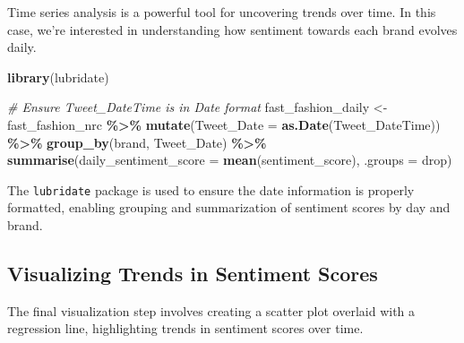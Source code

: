 \documentclass[
]{book}
\newenvironment{Shaded}{\begin{snugshade}}{\end{snugshade}}
\newcommand{\AttributeTok}[1]{\textcolor[rgb]{0.13,0.29,0.53}{#1}}
\newcommand{\CommentTok}[1]{\textcolor[rgb]{0.56,0.35,0.01}{\textit{#1}}}
\newcommand{\FunctionTok}[1]{\textcolor[rgb]{0.13,0.29,0.53}{\textbf{#1}}}
\newcommand{\NormalTok}[1]{#1}
\newcommand{\OtherTok}[1]{\textcolor[rgb]{0.56,0.35,0.01}{#1}}
\newcommand{\SpecialCharTok}[1]{\textcolor[rgb]{0.81,0.36,0.00}{\textbf{#1}}}
\newcommand{\StringTok}[1]{\textcolor[rgb]{0.31,0.60,0.02}{#1}}
\begin{document}
Time series analysis is a powerful tool for uncovering trends over time. In this case, we're interested in understanding how sentiment towards each brand evolves daily.

\begin{Shaded}
\begin{Highlighting}[]
\FunctionTok{library}\NormalTok{(lubridate)}

\CommentTok{\# Ensure Tweet\_DateTime is in Date format}
\NormalTok{fast\_fashion\_daily }\OtherTok{\textless{}{-}}\NormalTok{ fast\_fashion\_nrc }\SpecialCharTok{\%\textgreater{}\%}
  \FunctionTok{mutate}\NormalTok{(}\AttributeTok{Tweet\_Date =} \FunctionTok{as.Date}\NormalTok{(Tweet\_DateTime)) }\SpecialCharTok{\%\textgreater{}\%}
  \FunctionTok{group\_by}\NormalTok{(brand, Tweet\_Date) }\SpecialCharTok{\%\textgreater{}\%}
  \FunctionTok{summarise}\NormalTok{(}\AttributeTok{daily\_sentiment\_score =} \FunctionTok{mean}\NormalTok{(sentiment\_score), }\AttributeTok{.groups =} \StringTok{\textquotesingle{}drop\textquotesingle{}}\NormalTok{)}
\end{Highlighting}
\end{Shaded}

The \texttt{lubridate} package is used to ensure the date information is properly formatted, enabling grouping and summarization of sentiment scores by day and brand.

\hypertarget{visualizing-trends-in-sentiment-scores}{%
\subsection*{Visualizing Trends in Sentiment Scores}\label{visualizing-trends-in-sentiment-scores}}

The final visualization step involves creating a scatter plot overlaid with a regression line, highlighting trends in sentiment scores over time.
\end{document}
